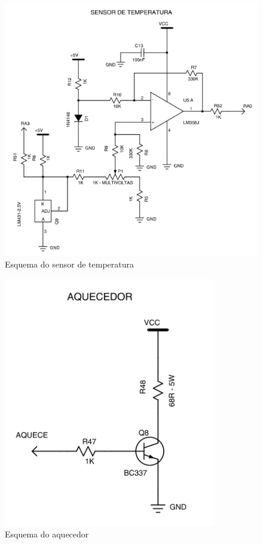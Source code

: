 \documentclass{article}
\begin{document}
\begin{figure}[H]
	\centering
	\includegraphics[width=0.9\linewidth]{esq_sensorTemp}
	\caption{Esquema do sensor de temperatura}
	\label{fig:esq_sensorTemp}
\end{figure}
\begin{figure}[H]
	\centering
	\includegraphics[width=0.9\linewidth]{esq_aquecedor}
	\caption{Esquema do aquecedor}
	\label{fig:esq_aquecedor}
\end{figure}
\end{document}
